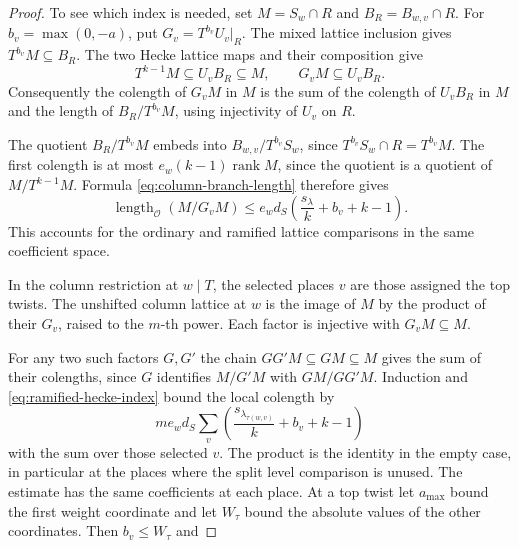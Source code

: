 \begin{proof}

To see which index is needed, set
\(M=S_w\cap R\) and \(B_R=B_{w,v}\cap R\). For
\(b_v=\max(0,-a)\), put \(G_v=T^{b_v}U_v|_R\).
The mixed lattice inclusion gives \(T^{b_v}M\subseteq B_R\).
The two Hecke lattice maps and their composition give
\[
         T^{k-1}M\subseteq U_v B_R\subseteq M,\qquad
                           G_v M\subseteq U_v B_R .
\]
Consequently the colength of \(G_v M\) in \(M\) is the
sum of the colength of \(U_v B_R\) in \(M\) and the
length of \(B_R/T^{b_v}M\), using injectivity of \(U_v\)
on \(R\).

The quotient \(B_R/T^{b_v}M\) embeds into \(B_{w,v}/T^{b_v}S_w\), since
\(T^{b_v}S_w\cap R=T^{b_v}M\).
The first colength is at most
\(e_w(k-1)\operatorname{rank} M\), since the quotient
is a quotient of \(M/T^{k-1}M\). Formula
\eqref{eq:column-branch-length} therefore gives
\begin{equation}\label{eq:ramified-hecke-index}
 \operatorname{length}_{\mathcal O}(M/G_vM)
           \le e_w d_S\left(\frac{s_\lambda}{k}+b_v+k-1\right).
\end{equation}
This accounts for the ordinary and ramified lattice
comparisons in the same coefficient space.


In the column restriction at \(w\mid T\), the selected
places \(v\) are those assigned the top twists.
The unshifted column lattice at \(w\) is the image of \(M\)
by the product of their \(G_v\), raised to the \(m\)-th power.
Each factor is injective with \(G_vM\subseteq M\).

For
any two such factors \(G,G'\) the chain
\(GG'M\subseteq GM\subseteq M\) gives the sum
of their colengths, since \(G\) identifies
\(M/G'M\) with \(GM/GG'M\). Induction and
\eqref{eq:ramified-hecke-index} bound the local colength by
\[
          m e_w d_S\sum_{v}
                 \left(\frac{s_{\lambda_{\tau(w,v)}}}{k}
                                      +b_v+k-1\right)
\]
with the sum over those selected \(v\). The product is the
identity in the empty case, in particular at the places
where the split level comparison is unused. The estimate
has the same coefficients at each place. At a top twist
let \(a_{\max}\) bound the first weight coordinate and
let \(W_\tau\) bound the absolute values of the other
coordinates. Then \(b_v\le W_\tau\) and


\end{proof}
